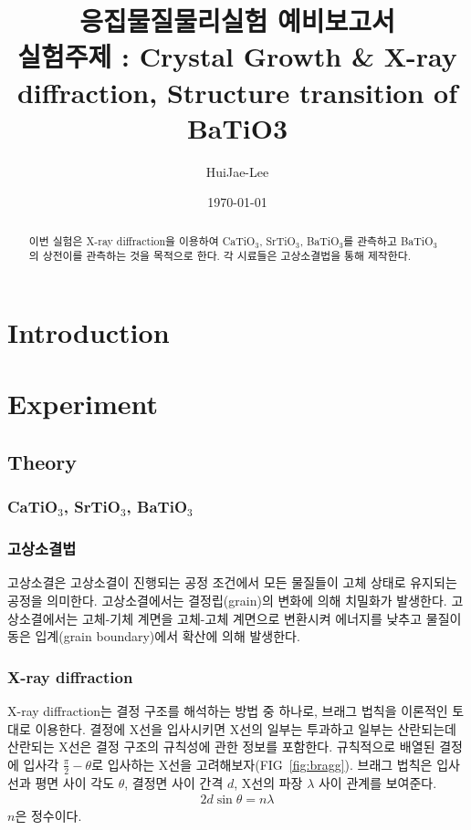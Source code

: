 \documentclass[aps,reprint,superscriptaddress,11pt]{revtex4-2}
\begin{document}
\title{응집물질물리실험 예비보고서 \\
\small 실험주제 : Crystal Growth \& X-ray diffraction,
Structure transition of BaTiO3}

\author{HuiJae-Lee}

\date{\today}


\begin{abstract}
이번 실험은 X-ray diffraction을 이용하여 CaTiO$_3$, SrTiO$_3$, BaTiO$_3$를 관측하고
BaTiO$_3$의 상전이를 관측하는 것을 목적으로 한다. 각 시료들은 고상소결법을 통해 제작한다.
 \end{abstract}
 
 \maketitle
 
 \section[Introduction]{Introduction}

\section[Experiment]{Experiment}
\subsection{Theory}
\subsubsection{CaTiO$_3$, SrTiO$_3$, BaTiO$_3$}

\subsubsection{고상소결법}
고상소결은 고상소결이 진행되는 공정 조건에서 모든 물질들이 고체 상태로 유지되는 공정을 의미한다.
고상소결에서는 결정립(grain)의 변화에 의해 치밀화가 발생한다. 고상소결에서는 고체-기체 계면을
고체-고체 계면으로 변환시켜 에너지를 낮추고 물질이동은 입계(grain boundary)에서 확산에 의해
발생한다.







 \subsubsection{X-ray diffraction}
X-ray diffraction는 결정 구조를 해석하는 방법 중 하나로, 브래그 법칙을 이론적인
토대로 이용한다. 결정에 X선을 입사시키면 X선의 일부는 투과하고 일부는 산란되는데
산란되는 X선은 결정 구조의 규칙성에 관한 정보를 포함한다. 규칙적으로 배열된 결정에
입사각 $\frac{\pi}{2}-\theta$로 입사하는 X선을 고려해보자(FIG~\ref{fig:bragg}).
브래그 법칙은 입사선과 평면 사이 각도 $\theta$, 결정면 사이 간격 $d$, X선의 파장 
$\lambda$ 사이 관계를 보여준다.
\begin{align}
  2d\sin{\theta} = n\lambda
\end{align}
$n$은 정수이다.
\end{document}
